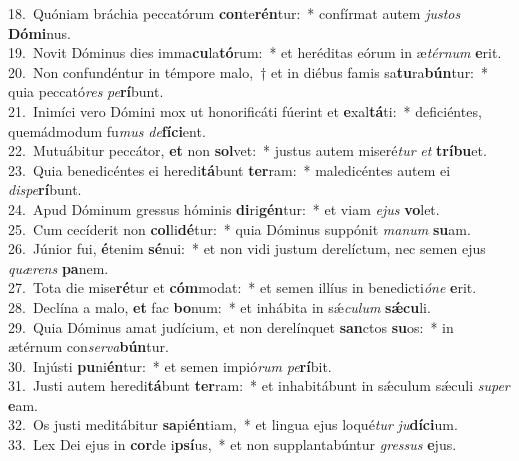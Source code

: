 {18.~}Quóniam bráchia peccatórum \textbf{con}te\textbf{rén}tur:~* confírmat autem \textit{ju}\textit{stos} \textbf{Dó}\textbf{mi}nus.\\
{19.~}Novit Dóminus dies imma\textbf{cu}la\textbf{tó}rum:~* et heréditas eórum in æ\textit{tér}\textit{num} \textbf{e}rit.\\
{20.~}Non confundéntur in témpore malo,~† et in diébus famis sa\textbf{tu}ra\textbf{bún}tur:~* quia peccató\textit{res} \textit{pe}\textbf{rí}bunt.\\
{21.~}Inimíci vero Dómini mox ut honorificáti fúerint et \textbf{e}xal\textbf{tá}ti:~* deficiéntes, quemádmodum fu\textit{mus} \textit{de}\textbf{fí}\textbf{ci}ent.\\
{22.~}Mutuábitur peccátor, \textbf{et} non \textbf{sol}vet:~* justus autem miseré\textit{tur} \textit{et} \textbf{trí}\textbf{bu}et.\\
{23.~}Quia benedicéntes ei heredi\textbf{tá}bunt \textbf{ter}ram:~* maledicéntes autem ei \textit{di}\textit{spe}\textbf{rí}bunt.\\
{24.~}Apud Dóminum gressus hóminis \textbf{di}ri\textbf{gén}tur:~* et viam \textit{e}\textit{jus} \textbf{vo}let.\\
{25.~}Cum cecíderit non \textbf{col}li\textbf{dé}tur:~* quia Dóminus suppónit \textit{ma}\textit{num} \textbf{su}am.\\
{26.~}Júnior fui, \textbf{é}tenim \textbf{sé}nui:~* et non vidi justum derelíctum, nec semen ejus \textit{quæ}\textit{rens} \textbf{pa}nem.\\
{27.~}Tota die mise\textbf{ré}tur et \textbf{cóm}modat:~* et semen illíus in benedicti\textit{ó}\textit{ne} \textbf{e}rit.\\
{28.~}Declína a malo, \textbf{et} fac \textbf{bo}num:~* et inhábita in sǽ\textit{cu}\textit{lum} \textbf{sǽ}\textbf{cu}li.\\
{29.~}Quia Dóminus amat judícium, et non derelínquet \textbf{san}ctos \textbf{su}os:~* in ætérnum con\textit{ser}\textit{va}\textbf{bún}tur.\\
{30.~}Injústi \textbf{pu}ni\textbf{én}tur:~* et semen impió\textit{rum} \textit{pe}\textbf{rí}bit.\\
{31.~}Justi autem heredi\textbf{tá}bunt \textbf{ter}ram:~* et inhabitábunt in sǽculum sǽculi \textit{su}\textit{per} \textbf{e}am.\\
{32.~}Os justi meditábitur \textbf{sa}pi\textbf{én}tiam,~* et lingua ejus loqué\textit{tur} \textit{ju}\textbf{dí}\textbf{ci}um.\\
{33.~}Lex Dei ejus in \textbf{cor}de i\textbf{psí}us,~* et non supplantabúntur \textit{gres}\textit{sus} \textbf{e}jus.\\
